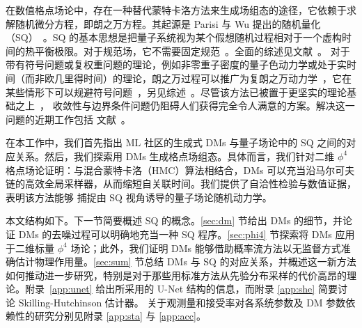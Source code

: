 在数值格点场论中，存在一种替代蒙特卡洛方法来生成场组态的途径，它依赖于求解随机微分方程，即朗之万方程。其起源是 Parisi 与 Wu 提出的随机量化（SQ）~\cite{Parisi:1980ys}。SQ 的基本思想是把量子系统视为某个假想随机过程相对于一个虚构时间的热平衡极限。对于规范场，它不需要固定规范~\cite{Parisi:1980ys}。全面的综述见文献~\cite{Damgaard:1987rr,Namiki:1993fd}。
对于带有符号问题或复权重问题的理论，例如非零重子密度的量子色动力学或处于实时间（而非欧几里得时间）的理论，朗之万过程可以推广为复朗之万动力学~\cite{Parisi:1983mgm}，它在某些情形下可以规避符号问题~\cite{Berges:2006xc,Aarts:2008rr,Aarts:2008wh,Seiler:2012wz,Sexty:2013ica}，另见综述~\cite{Aarts:2015tyj,Attanasio:2020spv,Berger:2019odf,Nagata:2021ugx}。尽管该方法已被置于更坚实的理论基础之上~\cite{Aarts:2009uq,Aarts:2011ax,Nagata:2016vkn,Aarts:2017vrv,Scherzer:2018hid}，
收敛性与边界条件问题仍阻碍人们获得完全令人满意的方案。解决这一问题的近期工作包括
文献~\cite{WesthHansen:2022iqd,Alvestad:2021hsi,Alvestad:2022abf,Lampl:2023xpb}。

在本工作中，我们首先指出 ML 社区的生成式 DMs 与量子场论中的 SQ 之间的对应关系。然后，我们探索用 DMs 生成格点场组态。具体而言，我们针对二维 $\phi^4$ 格点场论证明：与混合蒙特卡洛（HMC）算法相结合，DMs 可以充当沿马尔可夫链的高效全局采样器，从而缩短自关联时间。我们提供了自洽性检验与数值证据，表明该方法能够%
捕捉由 SQ 视角诱导的量子场论随机动力学。

本文结构如下。下一节简要概述 SQ 的概念。\ref{sec:dm} 节给出 DMs 的细节，并论证 DMs 的去噪过程可以明确地充当一种 SQ 程序。\ref{sec:phi4} 节探索将 DMs 应用于二维标量 $\phi^4$ 场论；此外，我们证明 DMs 能够借助概率流方法以无监督方式准确估计物理作用量。\ref{sec:sum} 节总结 DMs 与 SQ 的对应关系，并概述这一新方法如何推动进一步研究，特别是对于那些用标准方法从先验分布采样的代价高昂的理论。附录~\ref{app:unet} 给出所采用的 U-Net 结构的信息，而附录 \ref{app:she} 简要讨论 Skilling-Hutchinson 估计器。
关于观测量和接受率对各系统参数及 DM 参数依赖性的研究分别见附录 \ref{app:sta} 与 \ref{app:acc}。
